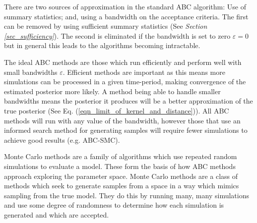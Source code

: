 \documentclass[11pt,a4paper]{article}
\theoremstyle{break}
\begin{document}
  \par There are two sources of approximation in the standard ABC algorithm: Use of summary statistics; and, using a bandwidth on the acceptance criteria. The first can be removed by using sufficient summary statistics (See \textit{Section \ref{sec_sufficiency}}). The second is eliminated if the bandwidth is set to zero $\varepsilon=0$ but in general this leads to the algorithms becoming intractable.

  \par The ideal ABC methods are those which run efficiently and perform well with small bandwidths $\varepsilon$. Efficient methods are important as this means more simulations can be processed in a given time-period, making convergence of the estimated posterior more likely. A method being able to handle smaller bandwidths means the posterior it produces will be a better approximation of the true posterior (See Eq. (\ref{eqn_limit_of_kernel_and_distance})). All ABC methods will run with any value of the bandwidth, however those that use an informed search method for generating samples will require fewer simulations to achieve good results (e.g. ABC-SMC).

  \par Monte Carlo methods are a family of algorithms which use repeated random simulations to evaluate a model. These form the basis of how ABC methods approach exploring the parameter space. Monte Carlo methods are a class of methods which seek to generate samples from a space in a way which mimics sampling from the true model. They do this by running many, many simulations and use some degree of randomness to determine how each simulation is generated and which are accepted.
\end{document}
